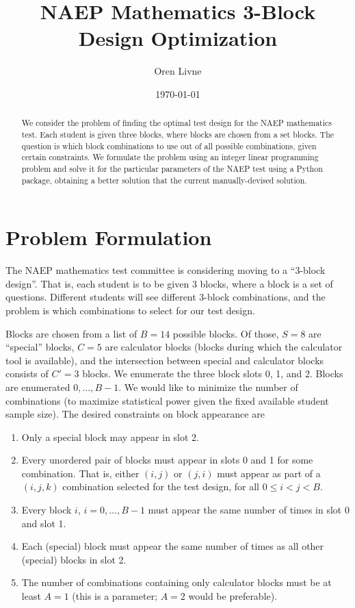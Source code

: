 \documentclass{article}
\title{NAEP Mathematics 3-Block Design Optimization}
\author[1]{Oren Livne}
\affil[1]{Educational Testing Service, 660 Rosedale Road, Attn: MS-12, T-197, Princeton, NJ 08540. Email: olivne@ets.org}
\date{\today}
\begin{document}
\maketitle

\begin{abstract}
We consider the problem of finding the optimal test design for the NAEP mathematics test. Each student is given three blocks, where blocks are chosen from a set blocks. The question is which block combinations to use out of all possible combinations, given certain constraints. We formulate the problem using an integer linear programming problem and solve it for the particular parameters of the NAEP test using a Python package, obtaining a better solution that the current manually-devised solution. 
\end{abstract}

\section{Problem Formulation}
The NAEP mathematics test committee is considering moving to a ``3-block design''. That is,
each student is to be given 3 blocks, where a block is a set of questions. Different students will see different 3-block combinations, and the problem is which combinations to select for our test design.

Blocks are chosen from a list of $B = 14$ possible blocks. Of those, $S = 8$ are ``special'' blocks, $C = 5$ are calculator blocks (blocks during which the calculator tool is available), and the intersection between special and calculator blocks consists of $C'=3$ blocks. We enumerate the three block slots 0, 1, and 2. Blocks are enumerated $0,\dots,B-1$. We would like to minimize the number of combinations (to maximize statistical power given the fixed available student sample size). The desired constraints on block appearance are
\begin{enumerate}
	\item Only a special block may appear in slot 2.
	\item Every unordered pair of blocks must appear in slots 0 and 1 for some combination. That is, either $(i, j)$ or $(j, i)$ must appear as part of a $(i, j, k)$ combination selected for the test design, for all $0 \leq i < j < B$.
	\item Every block $i$, $i=0,\dots,B-1$ must appear the same number of times in slot 0 and slot 1.
	\item Each (special) block must appear the same number of times as all other (special) blocks in slot 2.
	\item The number of combinations containing only calculator blocks must be at least $A=1$ (this is a parameter; $A=2$ would be preferable).
\end{enumerate}
\end{document}
